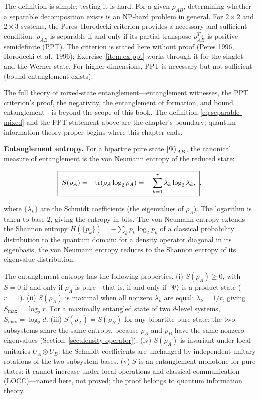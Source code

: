 The definition is simple; testing it is hard. For a given $\rho_{AB}$, determining whether a separable decomposition exists is an NP-hard problem in general. For $2 \times 2$ and $2 \times 3$ systems, the Peres--Horodecki criterion provides a necessary and sufficient condition: $\rho_{AB}$ is separable if and only if its partial transpose $\rho_{AB}^{T_B}$ is positive semidefinite (PPT). The criterion is stated here without proof (Peres 1996, Horodecki et al.\ 1996); Exercise~\ref{item:ex-ppt} works through it for the singlet and the Werner state. For higher dimensions, PPT is necessary but not sufficient (bound entanglement exists).

\begin{note}
The full theory of mixed-state entanglement---entanglement witnesses, the PPT criterion's proof, the negativity, the entanglement of formation, and bound entanglement---is beyond the scope of this book. The definition \eqref{eq:separable-mixed} and the PPT statement above are the chapter's boundary; quantum information theory proper begins where this chapter ends.
\end{note}

\medskip\noindent\textbf{Entanglement entropy.}
For a bipartite pure state $\ket{\Psi}_{AB}$, the canonical measure of entanglement is the von Neumann entropy of the reduced state:
\begin{linenomath}
\begin{equation}
\boxed{\;
S(\rho_A) = -\mathrm{tr}(\rho_A \log_2 \rho_A)
= -\sum_{k=1}^{r} \lambda_k \log_2 \lambda_k,
\;},
\label{eq:entanglement-entropy}
\end{equation}
\end{linenomath}
where $\{\lambda_k\}$ are the Schmidt coefficients (the eigenvalues of $\rho_A$). The logarithm is taken to base $2$, giving the entropy in bits. The von Neumann entropy extends the Shannon entropy $H(\{p_k\}) = -\sum_k p_k \log_2 p_k$ of a classical probability distribution to the quantum domain: for a density operator diagonal in its eigenbasis, the von Neumann entropy reduces to the Shannon entropy of its eigenvalue distribution.

The entanglement entropy has the following properties. (i) $S(\rho_A) \ge 0$, with $S = 0$ if and only if $\rho_A$ is pure---that is, if and only if $\ket{\Psi}$ is a product state ($r = 1$). (ii) $S(\rho_A)$ is maximal when all nonzero $\lambda_k$ are equal: $\lambda_k = 1/r$, giving $S_{\max} = \log_2 r$. For a maximally entangled state of two $d$-level systems, $S_{\max} = \log_2 d$. (iii) $S(\rho_A) = S(\rho_B)$ for any bipartite pure state: the two subsystems share the same entropy, because $\rho_A$ and $\rho_B$ have the same nonzero eigenvalues (Section~\ref{sec:density-operator}). (iv) $S(\rho_A)$ is invariant under local unitaries $U_A \otimes U_B$: the Schmidt coefficients are unchanged by independent unitary rotations of the two subsystem bases. (v) $S$ is an entanglement monotone for pure states: it cannot increase under local operations and classical communication (LOCC)---named here, not proved; the proof belongs to quantum information theory.

